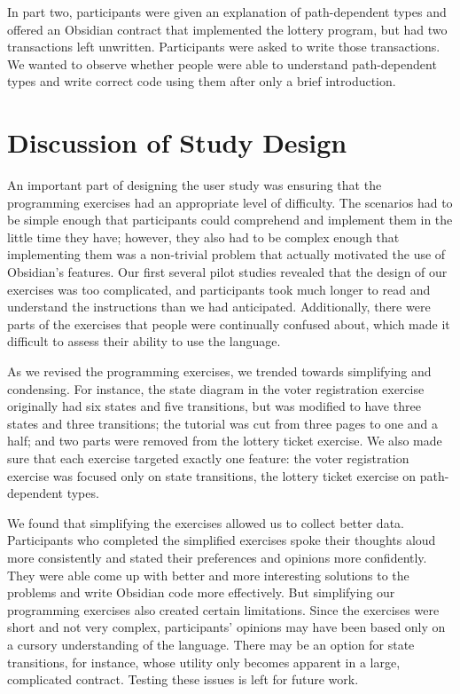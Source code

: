 \documentclass[sigplan,10pt,review]{acmart}\settopmatter{printfolios=true}
\begin{document}
In part two, participants were given an explanation of path-dependent types and offered an Obsidian contract that 
implemented the lottery program, but had two transactions left unwritten. Participants were asked to write 
those transactions. We wanted to observe whether people were able to understand path-dependent types and write 
correct code using them after only a brief introduction. 

\section{Discussion of Study Design}

An important part of designing the user study was ensuring that the programming exercises had an appropriate level of difficulty. The 
scenarios had to be simple enough that participants could comprehend and implement them in the little time they have; however, 
they also had to be complex enough that implementing them was a non-trivial problem that actually motivated the use of 
Obsidian's features. Our first several pilot studies revealed that the design of our exercises was too complicated, and 
participants took much longer to read and understand the instructions than we had anticipated. Additionally, there were parts 
of the exercises that people were continually confused about, which made it difficult to assess their ability to use the language. 

As we revised the programming exercises, we trended towards simplifying and condensing. For instance, the state diagram in 
the voter registration exercise originally had six states and five transitions, but was modified to have three states and three 
transitions; the tutorial was cut from three pages to one and a half; and two parts were removed from the lottery ticket exercise. 
We also made sure that each exercise targeted exactly one feature: the voter registration exercise was focused only on state 
transitions, the lottery ticket exercise on path-dependent types. 

We found that simplifying the exercises allowed us to collect better data. Participants who completed the simplified exercises 
spoke their thoughts aloud more consistently and stated their preferences and opinions more confidently. They were able
come up with better and more interesting solutions to the problems and write Obsidian code more effectively. 
But simplifying our programming exercises also created certain limitations. Since the exercises were short and not very 
complex, participants' opinions may have been based only on a cursory understanding of the language. There may be an option 
for state transitions, for instance, whose utility only becomes apparent in a large, complicated contract. 
Testing these issues is left for future work.
\end{document}
